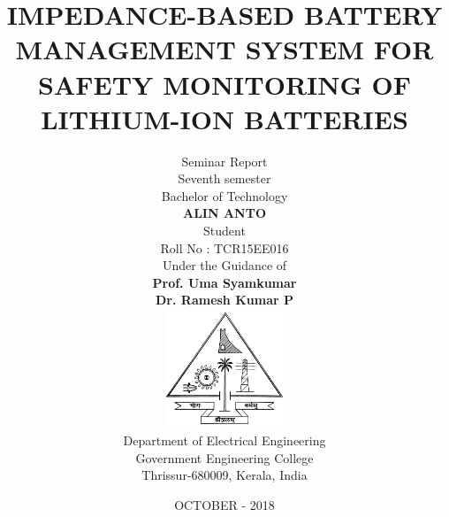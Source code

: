 \documentclass[12pt,a4paper]{report}
\begin{document}
\title{
	\textbf
	{\LARGE{IMPEDANCE-BASED BATTERY MANAGEMENT SYSTEM FOR SAFETY MONITORING OF LITHIUM-ION BATTERIES}} \vspace{.2in} \\ 
	}
\author{
	{\Large{Seminar Report}} \\
	{\large{Seventh semester}} \\
	{\large{Bachelor of Technology}}\vspace{.25in}\\
	{\bf\large ALIN ANTO} \\
	Student \\
	Roll No : TCR15EE016 \vspace{0.25in} \\
	Under the Guidance of \\
	{\bf Prof. Uma Syamkumar} \\
	{\bf Dr. Ramesh Kumar P} \\
	\includegraphics[height=1.4in, width=1.4in]{figures/gectemblem}\\
	Department of Electrical Engineering \\
	Government Engineering College  \\
	Thrissur-680009, Kerala, India \\
}
\date{OCTOBER - 2018}
\maketitle
\end{document}
